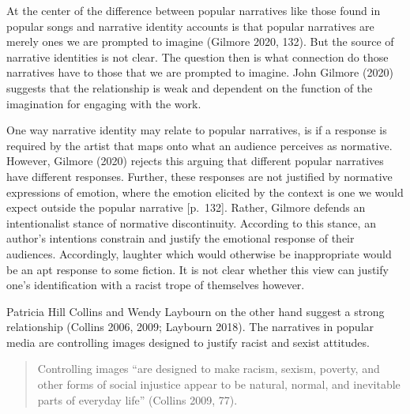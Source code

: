 \documentclass[
  letterpaper,
  DIV=11,
  numbers=noendperiod]{scrreprt}
\begin{document}
\begin{tcolorbox}[enhanced jigsaw, arc=.35mm, breakable, rightrule=.15mm, colback=white, colframe=quarto-callout-important-color-frame, bottomrule=.15mm, leftrule=.75mm, opacityback=0, toprule=.15mm, left=2mm]
\begin{tcolorbox}[enhanced jigsaw, arc=.35mm, breakable, rightrule=.15mm, colback=white, colframe=quarto-callout-tip-color-frame, bottomrule=.15mm, leftrule=.75mm, opacityback=0, toprule=.15mm, left=2mm]
At the center of the difference between popular narratives like those
found in popular songs and narrative identity accounts is that popular
narratives are merely ones we are prompted to imagine (Gilmore 2020,
132). But the source of narrative identities is not clear. The question
then is what connection do those narratives have to those that we are
prompted to imagine. John Gilmore (2020) suggests that the relationship
is weak and dependent on the function of the imagination for engaging
with the work.

One way narrative identity may relate to popular narratives, is if a
response is required by the artist that maps onto what an audience
perceives as normative. However, Gilmore (2020) rejects this arguing
that different popular narratives have different responses. Further,
these responses are not justified by normative expressions of emotion,
where the emotion elicited by the context is one we would expect outside
the popular narrative {[}p.~132{]}. Rather, Gilmore defends an
intentionalist stance of normative discontinuity. According to this
stance, an author's intentions constrain and justify the emotional
response of their audiences. Accordingly, laughter which would otherwise
be inappropriate would be an apt response to some fiction. It is not
clear whether this view can justify one's identification with a racist
trope of themselves however.

Patricia Hill Collins and Wendy Laybourn on the other hand suggest a
strong relationship (Collins 2006, 2009; Laybourn 2018). The narratives
in popular media are controlling images designed to justify racist and
sexist attitudes.

\begin{quote}
Controlling images ``are designed to make racism, sexism, poverty, and
other forms of social injustice appear to be natural, normal, and
inevitable parts of everyday life'' (Collins 2009, 77).
\end{quote}


\end{tcolorbox}
\end{tcolorbox}
\end{document}
